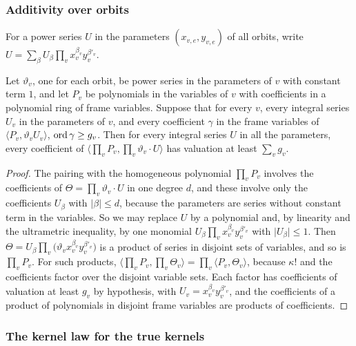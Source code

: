 \subsubsection{Additivity over orbits}

For a power series $U$ in the parameters $(x_{v,e},y_{v,e})$ of all orbits, write $U=\sum_\beta U_\beta\prod_vx_v^{\beta_v}y_v^{\beta'_v}$.

\begin{lemma}[additivity]\label{r1:lem:add}
Let $\vartheta_v$, one for each orbit, be power series in the parameters of $v$ with constant term $1$, and let $P_v$ be polynomials in the variables of $v$ with coefficients in a polynomial ring of frame variables. Suppose that for every $v$, every integral series $U_v$ in the parameters of $v$, and every coefficient $\gamma$ in the frame variables of $\langle P_v,\vartheta_vU_v\rangle$, $\operatorname{ord}\gamma\ge g_v$. Then for every integral series $U$ in all the parameters, every coefficient of $\langle\prod_vP_v,\prod_v\vartheta_v\cdot U\rangle$ has valuation at least $\sum_vg_v$.
\end{lemma}

\begin{proof}
The pairing with the homogeneous polynomial $\prod_vP_v$ involves the coefficients of $\Theta=\prod_v\vartheta_v\cdot U$ in one degree $d$, and these involve only the coefficients $U_\beta$ with $\lvert\beta\rvert\le d$, because the parameters are series without constant term in the variables. So we may replace $U$ by a polynomial and, by linearity and the ultrametric inequality, by one monomial $U_\beta\prod_vx_v^{\beta_v}y_v^{\beta'_v}$ with $\lvert U_\beta\rvert\le1$. Then $\Theta=U_\beta\prod_v\big(\vartheta_vx_v^{\beta_v}y_v^{\beta'_v}\big)$ is a product of series in disjoint sets of variables, and so is $\prod_vP_v$. For such products, $\langle\prod_vP_v,\prod_v\Theta_v\rangle=\prod_v\langle P_v,\Theta_v\rangle$, because $\kappa!$ and the coefficients factor over the disjoint variable sets. Each factor has coefficients of valuation at least $g_v$ by hypothesis, with $U_v=x_v^{\beta_v}y_v^{\beta'_v}$, and the coefficients of a product of polynomials in disjoint frame variables are products of coefficients.
\end{proof}



\subsubsection{The kernel law for the true kernels}

